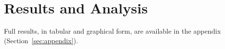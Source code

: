 \section{Results and Analysis}
\label{sec:results-and-analysis}

Full results, in tabular and graphical form, are available in the appendix (Section~\ref{sec:appendix}).




